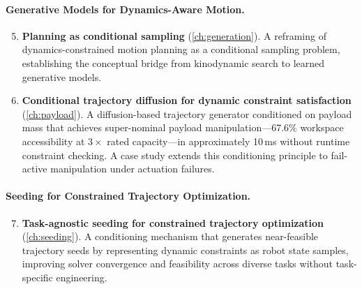 \paragraph{Generative Models for Dynamics-Aware Motion.}
\begin{enumerate}
  \setcounter{enumi}{4}
  \item \textbf{Planning as conditional sampling} (\cref{ch:generation}).
        A reframing of dynamics-constrained motion planning as a conditional sampling problem, establishing the conceptual bridge from kinodynamic search to learned generative models.

  \item \textbf{Conditional trajectory diffusion for dynamic constraint satisfaction} (\cref{ch:payload}).
        A diffusion-based trajectory generator conditioned on payload mass that achieves super-nominal payload manipulation---67.6\% workspace accessibility at $3\times$ rated capacity---in approximately 10\,ms without runtime constraint checking.
        A case study extends this conditioning principle to fail-active manipulation under actuation failures.
\end{enumerate}

\paragraph{Seeding for Constrained Trajectory Optimization.}
\begin{enumerate}
  \setcounter{enumi}{6}
  \item \textbf{Task-agnostic seeding for constrained trajectory optimization} (\cref{ch:seeding}).
        A conditioning mechanism that generates near-feasible trajectory seeds by representing dynamic constraints as robot state samples, improving solver convergence and feasibility across diverse tasks without task-specific engineering.
\end{enumerate}

